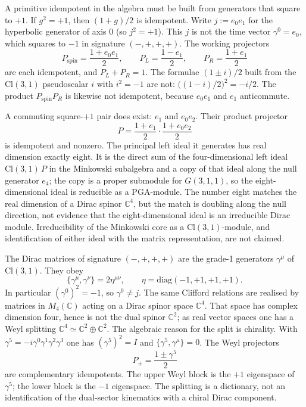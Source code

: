 \documentclass[a4paper]{article}
\theoremstyle{definition}
\begin{document}
A primitive idempotent in the algebra must be built from generators
that square to \(+1\). If \(g^2=+1\), then \((1+g)/2\) is idempotent.
Write \(j:=e_0e_1\) for the hyperbolic generator of axis \(0\) (so
\(j^2=+1\)). This \(j\) is not the time vector \(\gamma^0=e_0\), which
squares to \(-1\) in signature \((-,+,+,+)\). The working projectors
\[
P_{\mathrm{spin}}=\frac{1+e_0e_1}{2},\qquad
P_L=\frac{1-e_1}{2},\qquad
P_R=\frac{1+e_1}{2}
\]
are each idempotent, and \(P_L+P_R=1\). The formulae
\((1\pm i)/2\) built from the \(\mathrm{Cl}(3,1)\) pseudoscalar \(i\)
with \(i^2=-1\) are not: \(\bigl((1-i)/2\bigr)^2=-i/2\). The product
\(P_{\mathrm{spin}}P_R\) is likewise not idempotent, because \(e_0e_1\)
and \(e_1\) anticommute.

A commuting square-\(+1\) pair does exist: \(e_1\) and \(e_0e_2\). Their
product projector
\[
P=\frac{1+e_1}{2}\cdot\frac{1+e_0e_2}{2}
\]
is idempotent and nonzero. The principal left ideal it generates has
real dimension exactly eight. It is the direct sum of the
four-dimensional left ideal \(\mathrm{Cl}(3,1)\,P\) in the Minkowski
subalgebra and a copy of that ideal along the null generator
\(e_4\); the copy is a proper submodule for \(G(3,1,1)\), so the
eight-dimensional ideal is reducible as a PGA-module. The number
eight matches the real dimension of a Dirac spinor \(\mathbb{C}^4\),
but the match is doubling along the null direction, not evidence
that the eight-dimensional ideal is an irreducible Dirac module.
Irreducibility of the Minkowski core as a \(\mathrm{Cl}(3,1)\)-module,
and identification of either ideal with the matrix representation,
are not claimed.

The Dirac matrices of signature \((-,+,+,+)\) are the grade-1
generators \(\gamma^\mu\) of \(\mathrm{Cl}(3,1)\). They obey
\[
\{\gamma^\mu,\gamma^\nu\}=2\eta^{\mu\nu},\qquad
\eta=\mathrm{diag}(-1,+1,+1,+1).
\]
In particular \((\gamma^0)^2=-1\), so \(\gamma^0\neq j\). The same
Clifford relations are realised by matrices in \(M_4(\mathbb{C})\)
acting on a Dirac spinor space \(\mathbb{C}^4\). That space has complex
dimension four, hence is not the dual spinor \(\mathbb{C}^2\); as real
vector spaces one has a Weyl splitting
\(\mathbb{C}^4\simeq\mathbb{C}^2\oplus\mathbb{C}^2\). The algebraic
reason for the split is chirality. With
\(\gamma^5=-i\gamma^0\gamma^1\gamma^2\gamma^3\) one has
\((\gamma^5)^2=I\) and \(\{\gamma^5,\gamma^\mu\}=0\). The Weyl
projectors
\[
P_\pm=\frac{1\pm\gamma^5}{2}
\]
are complementary idempotents. The upper Weyl block is the
\(+1\) eigenspace of \(\gamma^5\); the lower block is the \(-1\)
eigenspace. The splitting is a dictionary, not an identification of the
dual-sector kinematics with a chiral Dirac component.
\end{document}
